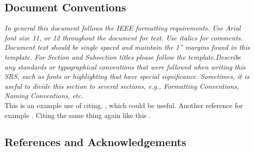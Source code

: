     \subsection{Document Conventions}
        \emph{In general this document follows the IEEE formatting requirements. Use Arial font size 11, or 12 throughout the document for text. Use italics for comments. Document text should be single spaced and maintain the 1” margins found in this template. For Section and Subsection titles please follow the template.\gnl Describe any standards or typographical conventions that were followed when writing this SRS, such as fonts or highlighting that have special significance. Sometimes, it is useful to divide this section to several sections, e.g., Formatting Conventions, Naming Conventions, etc.}\\
        This is an example use of citing, \cite{anotherone}, which could be useful. Another reference for example \cite{keyword}. Citing the same thing again like this \cite{anotherone}.
    \subsection{References and Acknowledgements}
        \printbibliography[heading=none]
